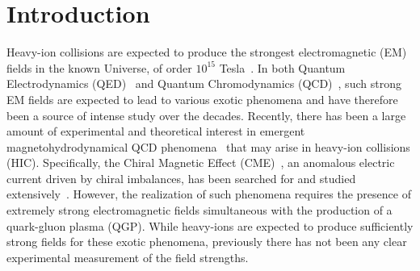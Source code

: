 \documentclass[12pt,epjc3]{svjour3}\sloppy
\begin{document}
\setcounter{tocdepth}{3}
\newpage
\tableofcontents
\newpage

%
%
\section{Introduction}
\label{intro}
Heavy-ion collisions are expected to produce the strongest electromagnetic (EM) fields in the known Universe, of order $10^{15}$ Tesla~\cite{Norbeck2006,skokovEstimateMagneticField2009,mclerranCommentsElectromagneticField2014}.  In both Quantum Electrodynamics (QED)~\cite{battestiHighMagneticFields2018,hattoriVacuumBirefringenceStrong2013} and Quantum Chromodynamics (QCD)~\cite{asakawaElectricChargeSeparation2010,skokovChiralMagneticEffect2017}, such strong EM fields are expected to lead to various exotic phenomena and have therefore been a source of intense study over the decades. Recently, there has been a large amount of experimental and theoretical interest in emergent magnetohydrodynamical QCD phenomena~\cite{kharzeevChiralMagneticVortical2015} that may arise in heavy-ion collisions (HIC). Specifically, the Chiral Magnetic Effect (CME)~\cite{fukushimaChiralMagneticEffect2008a,kharzeevEffectsTopologicalCharge2007}, an anomalous electric current driven by chiral imbalances, has been searched for and studied extensively~\cite{buividovichNumericalEvidenceChiral2009,wangSearchChiralMagnetic2018,zhaoExperimentalSearchesChiral2019}. However, the realization of such phenomena requires the presence of extremely strong electromagnetic fields simultaneous with the production of a quark-gluon plasma (QGP). While heavy-ions are expected to produce sufficiently strong fields for these exotic phenomena, previously there has not been any clear experimental measurement of the field strengths. 
\end{document}
